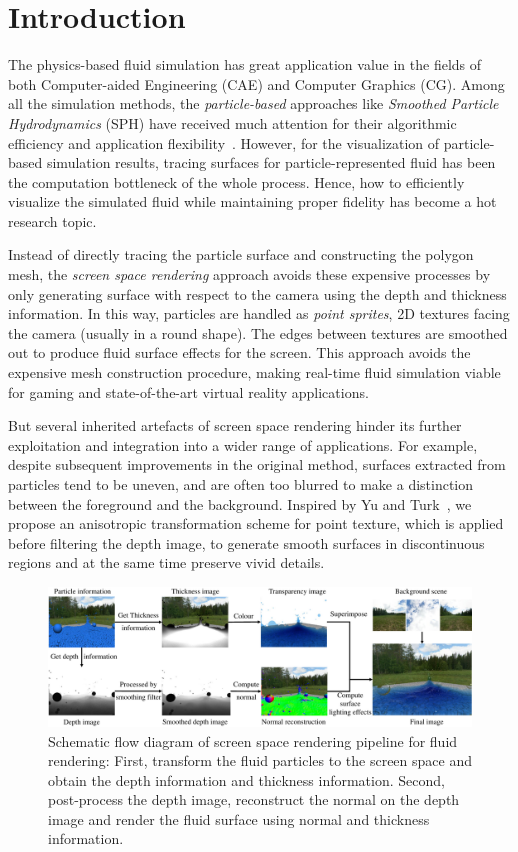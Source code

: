 \documentclass[times,twocolumn,final]{elsarticle}
\begin{document}
\linenumbers

\section{Introduction}
\label{sec1}
The physics-based fluid simulation has great application value in the fields of both Computer-aided Engineering (CAE) and Computer Graphics (CG).
Among all the simulation methods, the \emph{particle-based} approaches like \emph{Smoothed Particle Hydrodynamics} (SPH) have received much attention for their algorithmic efficiency and application flexibility~\cite{Ihmsen14}. 
However, for the visualization of particle-based simulation results, tracing surfaces for particle-represented fluid has been the computation bottleneck of the whole process. Hence, how to efficiently visualize the simulated fluid while maintaining proper fidelity has become a hot research topic.

Instead of directly tracing the particle surface and constructing the polygon mesh, the \emph{screen space rendering} approach avoids these expensive processes by only generating surface with respect to the camera using the depth and thickness information. In this way, particles are handled as \emph{point sprites}, 2D textures facing the camera (usually in a round shape). The edges between textures are smoothed out to produce fluid surface effects for the screen\cite{ref:ref2}. This approach avoids the expensive mesh construction procedure, making real-time fluid simulation viable for gaming and state-of-the-art virtual reality applications\cite{ref:ref3}. 

But several inherited artefacts of screen space rendering hinder its further exploitation and integration into a wider range of applications. For example, despite subsequent improvements in the original method, surfaces extracted from particles tend to be uneven, and are often too blurred to make a distinction between the foreground and the background. Inspired by Yu and Turk~\cite{yu2013reconstructing}, we propose an anisotropic transformation scheme for point texture, which is applied before filtering the depth image, to generate smooth surfaces in discontinuous regions and at the same time preserve vivid details.

\begin{figure}
    \includegraphics[width=\linewidth]{figs/figure2_b.pdf}
    \caption{Schematic flow diagram of screen space rendering pipeline for fluid rendering: First, transform the fluid particles to the screen space and obtain the depth information and thickness information. Second, post-process the depth image, reconstruct the normal on the depth image and render the fluid surface using normal and thickness information.}
    \label{fig:figure2}
\end{figure}
\end{document}
